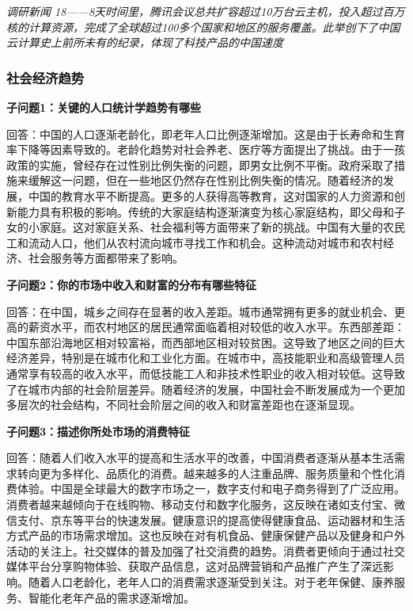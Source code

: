 \documentclass[a4paper,12pt]{article}
\begin{document}
    \textit{}

    \textit{调研新闻 18——8天时间⾥，腾讯会议总共扩容超过10万台云主机，投⼊超过百万核的计算资源，完成了全球超过100多个国家和地区的服务覆盖。此举创下了中国云计算史上前所未有的纪录，体现了科技产品的中国速度}
    
    \textit{}
    
    \subsubsection{社会经济趋势}
    \textbf{子问题1：关键的人口统计学趋势有哪些}

    回答：中国的人口逐渐老龄化，即老年人口比例逐渐增加。这是由于长寿命和生育率下降等因素导致的。老龄化趋势对社会养老、医疗等方面提出了挑战。由于一孩政策的实施，曾经存在过性别比例失衡的问题，即男女比例不平衡。政府采取了措施来缓解这一问题，但在一些地区仍然存在性别比例失衡的情况。随着经济的发展，中国的教育水平不断提高。更多的人获得高等教育，这对国家的人力资源和创新能力具有积极的影响。传统的大家庭结构逐渐演变为核心家庭结构，即父母和子女的小家庭。这对家庭关系、社会福利等方面带来了新的挑战。中国有大量的农民工和流动人口，他们从农村流向城市寻找工作和机会。这种流动对城市和农村经济、社会服务等方面都带来了影响。

    \textbf{子问题2：你的市场中收入和财富的分布有哪些特征}

    回答：在中国，城乡之间存在显著的收入差距。城市通常拥有更多的就业机会、更高的薪资水平，而农村地区的居民通常面临着相对较低的收入水平。东西部差距： 中国东部沿海地区相对较富裕，而西部地区相对较贫困。这导致了地区之间的巨大经济差异，特别是在城市化和工业化方面。在城市中，高技能职业和高级管理人员通常享有较高的收入水平，而低技能工人和非技术性职业的收入相对较低。这导致了在城市内部的社会阶层差异。随着经济的发展，中国社会不断发展成为一个更加多层次的社会结构，不同社会阶层之间的收入和财富差距也在逐渐显现。

    \textbf{子问题3：描述你所处市场的消费特征}

    回答：随着人们收入水平的提高和生活水平的改善，中国消费者逐渐从基本生活需求转向更为多样化、品质化的消费。越来越多的人注重品牌、服务质量和个性化消费体验。中国是全球最大的数字市场之一，数字支付和电子商务得到了广泛应用。消费者越来越倾向于在线购物、移动支付和数字化服务，这反映在诸如支付宝、微信支付、京东等平台的快速发展。健康意识的提高使得健康食品、运动器材和生活方式产品的市场需求增加。这也反映在对有机食品、健康保健产品以及健身和户外活动的关注上。社交媒体的普及加强了社交消费的趋势。消费者更倾向于通过社交媒体平台分享购物体验、获取产品信息，这对品牌营销和产品推广产生了深远影响。随着人口老龄化，老年人口的消费需求逐渐受到关注。对于老年保健、康养服务、智能化老年产品的需求逐渐增加。
\end{document}
